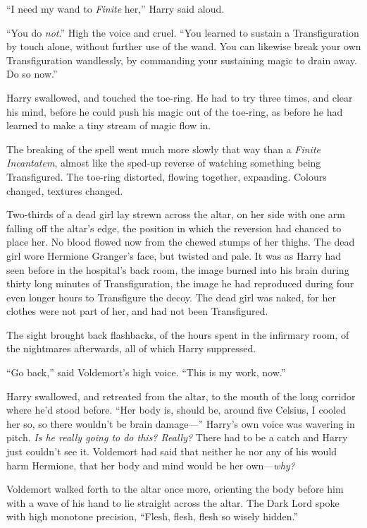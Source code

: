 “I need my wand to \emph{Finite} her,” Harry said aloud.

“You do \emph{not}.” High the voice and cruel. “You learned to sustain a Transfiguration by touch alone, without further use of the wand. You can likewise break your own Transfiguration wandlessly, by commanding your sustaining magic to drain away. Do so now.”

Harry swallowed, and touched the toe-ring. He had to try three times, and clear his mind, before he could push his magic out of the toe-ring, as before he had learned to make a tiny stream of magic flow in.

The breaking of the spell went much more slowly that way than a \emph{Finite Incantatem}, almost like the sped-up reverse of watching something being Transfigured. The toe-ring distorted, flowing together, expanding. Colours changed, textures changed.

Two-thirds of a dead girl lay strewn across the altar, on her side with one arm falling off the altar’s edge, the position in which the reversion had chanced to place her. No blood flowed now from the chewed stumps of her thighs. The dead girl wore Hermione Granger’s face, but twisted and pale. It was as Harry had seen before in the hospital’s back room, the image burned into his brain during thirty long minutes of Transfiguration, the image he had reproduced during four even longer hours to Transfigure the decoy. The dead girl was naked, for her clothes were not part of her, and had not been Transfigured.

The sight brought back flashbacks, of the hours spent in the infirmary room, of the nightmares afterwards, all of which Harry suppressed.

“Go back,” said Voldemort’s high voice. “This is my work, now.”

Harry swallowed, and retreated from the altar, to the mouth of the long corridor where he’d stood before. “Her body is, should be, around five Celsius, I cooled her so, so there wouldn’t be brain damage—” Harry’s own voice was wavering in pitch. \emph{Is he really going to do this? Really?} There had to be a catch and Harry just couldn’t see it. Voldemort had said that neither he nor any of his would harm Hermione, that her body and mind would be her own—\emph{why?}

Voldemort walked forth to the altar once more, orienting the body before him with a wave of his hand to lie straight across the altar. The Dark Lord spoke with high monotone precision, “Flesh, flesh, flesh so wisely hidden.”

